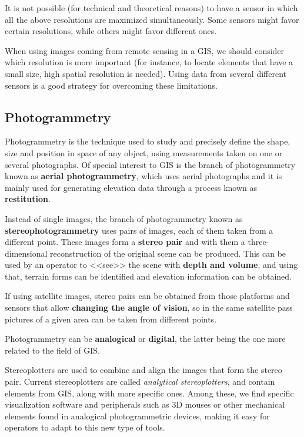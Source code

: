 It is not possible (for technical and theoretical reasons) to have a sensor in which all the above resolutions are maximized simultaneously. Some sensors might favor certain resolutions, while others might favor different ones.

When using images coming from remote sensing in a GIS, we should consider which resolution is more important (for instance, to locate elements that have a small size, high spatial resolution is needed). Using data from several different sensors is a good strategy for overcoming these limitations.


\subsection{Photogrammetry}

Photogrammetry is the technique used to study and precisely define the shape, size and position in space of any object, using measurements taken on one or several photographs. Of special interest to GIS is the branch of photogrammetry known as \textbf{aerial photogrammetry}, which uses aerial photographs and it is mainly used for generating elevation data through a process known as \textbf{restitution}.

Instead of single images, the branch of photogrammetry known as \textbf{stereophotogrammetry} uses pairs of images, each of them taken from a different point. These images form a \textbf{stereo pair} and with them a three-dimensional reconstruction of the original scene can be produced. This can be used by an operator to <<see>> the scene with \textbf{depth and volume}, and using that, terrain forms can be identified and elevation information can be obtained. 

If using satellite images, stereo pairs can be obtained from those platforms and sensors that allow \textbf{changing the angle of vision}, so in the same satellite pass pictures of a given area can be taken from different points.

Photogrammetry can be \textbf{analogical} or \textbf{digital}, the latter being the one more related to the field of GIS.

Stereoplotters are used to combine and align the images that form the stereo pair. Current stereoplotters are called \emph{analytical stereoplotters}, and contain elements from GIS, along with more specific ones. Among these, we find specific visualization software and peripherals such as 3D mouses or other mechanical elements found in analogical photogrammetric devices, making it easy for operators to adapt to this new type of tools.

